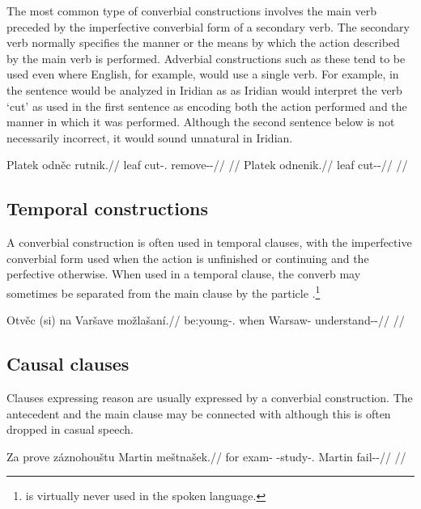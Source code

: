 The most common type of converbial constructions involves the main verb preceded
by the imperfective converbial form of a secondary verb. The secondary verb
normally specifies the manner or the means by which the action described by the
main verb is performed. Adverbial constructions such as these tend to be used
even where English, for example, would use a single verb. For example, in the
sentence  would be analyzed in Iridian as  as Iridian would interpret the verb `cut' as used
in the first sentence as encoding both the action performed and the manner in
which it was performed. Although the second sentence below is not necessarily
incorrect, it would sound unnatural in Iridian.

\pex
\a\begingl
  \gla Platek odněc rutnik.//
  \glb leaf cut-\Cv{}.\Ipf{} remove-\Pv{}-\Pf{}//
  \glft {}//
\endgl
\a\begingl
  \gla{}Platek odnenik.//
  \glb leaf cut-\Pv{}-\Pf{}//
  \glft {}//
\endgl
\xe

\subsection{Temporal constructions}

A converbial construction is often used in temporal clauses, with the imperfective converbial form used when the action is
unfinished or continuing and the perfective otherwise. When used in a temporal
clause, the converb may sometimes be separated from the main clause by the
particle .\footnote{ is virtually never used in the spoken
language.}

\pex
\begingl
\gla Otvěc (si) na Varšave možlašaní.//
\glb be:young-\Cv{}.\Ipf{} when \Loc{} Warsaw-\Acc{} understand-\Av{}-\Ret{}//
\glft {}//
\endgl
\xe

\subsection{Causal clauses}

Clauses expressing reason are usually expressed by a converbial construction.
The antecedent and the main clause may be connected with 
although this is often dropped in casual speech.

\pex
\begingl
\gla Za prove záznohouštu Martin meštnašek.//
\glb for exam-\Acc{} \Neg{}-study-\Cv{}.\Pf{} Martin fail-\Av{}-\Pf{}//
\glft {}//
\endgl
\xe


